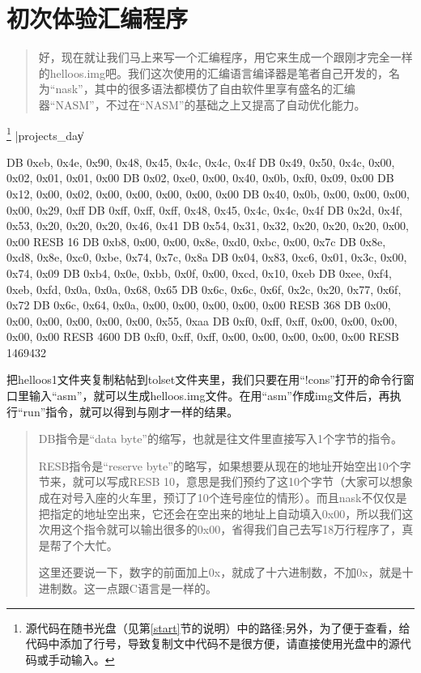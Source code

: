 \section{	初次体验汇编程序	}
\begin{quote}
好，现在就让我们马上来写一个汇编程序，用它来生成一个跟刚才完全一样的helloos.img吧。我们这次使用的汇编语言编译器是笔者自己开发的，名为“nask”，其中的很多语法都模仿了自由软件里享有盛名的汇编器“NASM”，不过在“NASM”的基础之上又提高了自动优化能力。
\end{quote}

\dag \footnote{源代码在随书光盘（见第\ref{start}节的说明）中的路径;另外，为了便于查看，给代码中添加了行号，导致复制文中代码不是很方便，请直接使用光盘中的源代码或手动输入。}
|projects_day\|
\begin{code}[label=helloos.nas]
    DB	0xeb, 0x4e, 0x90, 0x48, 0x45, 0x4c, 0x4c, 0x4f
	DB	0x49, 0x50, 0x4c, 0x00, 0x02, 0x01, 0x01, 0x00
	DB	0x02, 0xe0, 0x00, 0x40, 0x0b, 0xf0, 0x09, 0x00
	DB	0x12, 0x00, 0x02, 0x00, 0x00, 0x00, 0x00, 0x00
	DB	0x40, 0x0b, 0x00, 0x00, 0x00, 0x00, 0x29, 0xff
	DB	0xff, 0xff, 0xff, 0x48, 0x45, 0x4c, 0x4c, 0x4f
	DB	0x2d, 0x4f, 0x53, 0x20, 0x20, 0x20, 0x46, 0x41
	DB	0x54, 0x31, 0x32, 0x20, 0x20, 0x20, 0x00, 0x00
	RESB	16
	DB	0xb8, 0x00, 0x00, 0x8e, 0xd0, 0xbc, 0x00, 0x7c
	DB	0x8e, 0xd8, 0x8e, 0xc0, 0xbe, 0x74, 0x7c, 0x8a
	DB	0x04, 0x83, 0xc6, 0x01, 0x3c, 0x00, 0x74, 0x09
	DB	0xb4, 0x0e, 0xbb, 0x0f, 0x00, 0xcd, 0x10, 0xeb
	DB	0xee, 0xf4, 0xeb, 0xfd, 0x0a, 0x0a, 0x68, 0x65
	DB	0x6c, 0x6c, 0x6f, 0x2c, 0x20, 0x77, 0x6f, 0x72
	DB	0x6c, 0x64, 0x0a, 0x00, 0x00, 0x00, 0x00, 0x00
	RESB	368
	DB	0x00, 0x00, 0x00, 0x00, 0x00, 0x00, 0x55, 0xaa
	DB	0xf0, 0xff, 0xff, 0x00, 0x00, 0x00, 0x00, 0x00
	RESB	4600
	DB	0xf0, 0xff, 0xff, 0x00, 0x00, 0x00, 0x00, 0x00
	RESB	1469432
\end{code}

把helloos1文件夹复制粘帖到tolset文件夹里，我们只要在用“!cons”打开的命令行窗口里输入“asm”，就可以生成helloos.img文件。在用“asm”作成img文件后，再执行“run”指令，就可以得到与刚才一样的结果。
\cs
\begin{quote}
DB指令是“data byte”的缩写，也就是往文件里直接写入1个字节的指令。

RESB指令是“reserve byte”的略写，如果想要从现在的地址开始空出10个字节来，就可以写成RESB 10，意思是我们预约了这10个字节（大家可以想象成在对号入座的火车里，预订了10个连号座位的情形）。而且nask不仅仅是把指定的地址空出来，它还会在空出来的地址上自动填入0x00，所以我们这次用这个指令就可以输出很多的0x00，省得我们自己去写18万行程序了，真是帮了个大忙。

这里还要说一下，数字的前面加上0x，就成了十六进制数，不加0x，就是十进制数。这一点跟C语言是一样的。
\end{quote}

